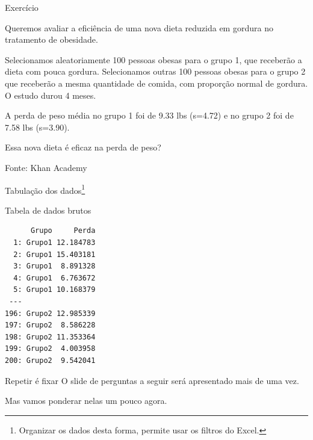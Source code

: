 \documentclass{beamer}
\begin{document}
\begin{frame}{\scriptsize Exercício}
  \begin{exampleblock}{}
    \footnotesize
    Queremos avaliar a eficiência de uma nova dieta reduzida em
    gordura no tratamento de obesidade.

    \bigskip
    {\footnotesize
      Selecionamos aleatoriamente 100 pessoas obesas para o grupo 1, que receberão a dieta com pouca gordura.
      Selecionamos outras 100 pessoas obesas para o grupo 2 que receberão a mesma quantidade de comida, com proporção normal de gordura.
      O estudo durou 4 meses.
    }

    \bigskip
    \begin{exampleblock}{}
      \footnotesize
      A perda de peso média no grupo 1 foi de 9.33 lbs
      (s=4.72) e no grupo 2 foi de 7.58 lbs (s=3.90).
    \end{exampleblock}
  \end{exampleblock}
  \begin{block}{}
    Essa nova dieta é eficaz na perda de peso?
  \end{block}
  \hfill {\footnotesize Fonte: Khan Academy}
\end{frame}

\begin{frame}[fragile]{\scriptsize Tabulação dos dados\footnote{Organizar os dados desta forma, permite usar os filtros do Excel.}}
  \begin{block}{Tabela de dados brutos}
    \scriptsize
\begin{verbatim}
      Grupo     Perda
  1: Grupo1 12.184783
  2: Grupo1 15.403181
  3: Grupo1  8.891328
  4: Grupo1  6.763672
  5: Grupo1 10.168379
 ---                 
196: Grupo2 12.985339
197: Grupo2  8.586228
198: Grupo2 11.353364
199: Grupo2  4.003958
200: Grupo2  9.542041
\end{verbatim}
  \end{block}
\end{frame}

\begin{frame}{\scriptsize }
  \begin{block}{Repetir é fixar}
    {\small
    O slide de perguntas a seguir será apresentado mais de uma vez.}

    \begin{center}
      Mas vamos ponderar nelas um pouco agora.
    \end{center}
  \end{block}
\end{frame}
\end{document}
